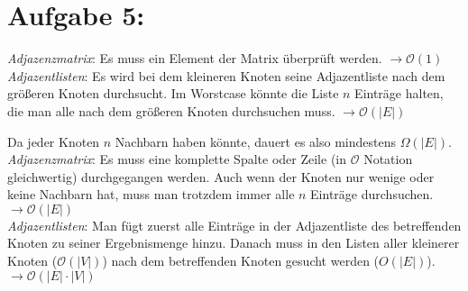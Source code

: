 \documentclass[11pt]{scrartcl} %
\begin{document}
\section*{Aufgabe 5:}
\begin{compactenum}[(a)]
\item
\emph{Adjazenzmatrix}: Es muss ein Element der Matrix überprüft werden. $\rightarrow \mathcal O(1)$\\[0.1cm]
\emph{Adjazentlisten}: Es wird bei dem kleineren Knoten seine Adjazentliste nach dem größeren Knoten durchsucht. Im Worstcase könnte die Liste $n$ Einträge halten, die man alle nach dem größeren Knoten durchsuchen muss. $\rightarrow \mathcal O(|E|)$\\
\item
Da jeder Knoten $n$ Nachbarn haben könnte, dauert es also mindestens $\Omega(|E|)$.\\[0.2cm]
\emph{Adjazenzmatrix}: Es muss eine komplette Spalte oder Zeile (in $\mathcal O$ Notation gleichwertig) durchgegangen werden. Auch wenn der Knoten nur wenige oder keine Nachbarn hat, muss man trotzdem immer alle $n$ Einträge durchsuchen. $\rightarrow \mathcal O(|E|)$\\[0.1cm]
\emph{Adjazentlisten}: Man fügt zuerst alle Einträge in der Adjazentliste des betreffenden Knoten zu seiner Ergebnismenge hinzu. Danach muss in den Listen aller kleinerer Knoten ($\mathcal O(|V|)$) nach dem betreffenden Knoten gesucht werden ($O(|E|)$). $\rightarrow \mathcal O(|E| \cdot |V|)$
\end{compactenum}
\end{document}
